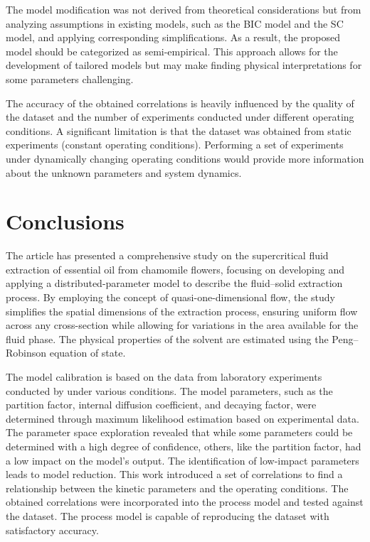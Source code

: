 \documentclass[a4paper,fleqn]{cas-dc}
\begin{document}
					The model modification was not derived from theoretical considerations but from analyzing assumptions in existing models, such as the BIC model and the SC model, and applying corresponding simplifications. As a result, the proposed model should be categorized as semi-empirical. This approach allows for the development of tailored models but may make finding physical interpretations for some parameters challenging.
					
					The accuracy of the obtained correlations is heavily influenced by the quality of the dataset and the number of experiments conducted under different operating conditions. A significant limitation is that the dataset was obtained from static experiments (constant operating conditions). Performing a set of experiments under dynamically changing operating conditions would provide more information about the unknown parameters and system dynamics.
					
					\section{Conclusions} \label{CH: Conclusion}
					
					The article has presented a comprehensive study on the supercritical fluid extraction of essential oil from chamomile flowers, focusing on developing and applying a distributed-parameter model to describe the fluid--solid extraction process. By employing the concept of quasi-one-dimensional flow, the study simplifies the spatial dimensions of the extraction process, ensuring uniform flow across any cross-section while allowing for variations in the area available for the fluid phase. The physical properties of the solvent are estimated using the Peng--Robinson equation of state.
					
					The model calibration is based on the data from laboratory experiments conducted by \citet{Povh2001} under various conditions. The model parameters, such as the partition factor, internal diffusion coefficient, and decaying factor, were determined through maximum likelihood estimation based on experimental data. The parameter space exploration revealed that while some parameters could be determined with a high degree of confidence, others, like the partition factor, had a low impact on the model's output. The identification of low-impact parameters leads to model reduction. This work introduced a set of correlations to find a relationship between the kinetic parameters and the operating conditions. The obtained correlations were incorporated into the process model and tested against the dataset. The process model is capable of reproducing the dataset with satisfactory accuracy.
					
\end{document}

